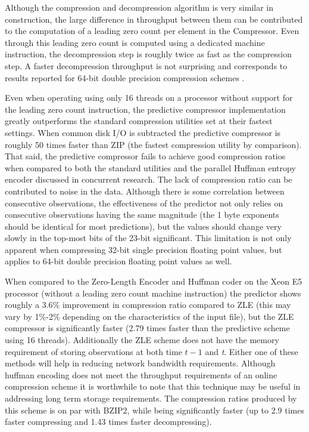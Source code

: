 Although the compression and decompression algorithm is very similar in construction, the large difference in throughput between them can be contributed to the computation of a 
leading zero count per element in the Compressor. Even through this leading zero count is computed using a dedicated machine instruction, the decompression step is roughly 
twice as fast as the compression step. A faster decompression throughput is not surprising and corresponds to results reported for 64-bit double precision compression schemes 
\cite{4976448,O'Neil:2011:FDC:1964179.1964189}.

Even when operating using only 16 threads on a processor without support for the leading zero count instruction, the predictive compressor implementation greatly outperforms the 
standard compression utilities set at their fastest settings. When common disk I/O is subtracted the predictive compressor is roughly 50 times faster than ZIP (the fastest compression 
utility by comparison). That said, the predictive compressor fails to achieve good compression ratios when compared to both the standard utilities and the parallel Huffman entropy encoder 
discussed in concurrent research. The lack of compression ratio can be contributed to noise in the data. Although there is some correlation between consecutive observations, the effectiveness 
of the predictor not only relies on consecutive observations having the same magnitude (the 1 byte exponents should be identical for most predictions), but the values should change very 
slowly in the top-most bits of the 23-bit significant. This limitation is not only apparent when compressing 32-bit single precision floating point values, but applies to 64-bit double 
precision floating point values as well.

When compared to the Zero-Length Encoder and Huffman coder on the Xeon E5 processor (without a leading zero count machine instruction) the predictor shows roughly a 3.6\% improvement
in compression ratio compared to ZLE (this may vary by 1\%-2\% depending on the characteristics of the input file), but the ZLE compressor is significantly faster (2.79 times faster than
the predictive scheme using 16 threads). Additionally the ZLE scheme does not have the memory requirement of storing observations at both time $t-1$ and \textit{t}. Either one
of these methods will help in reducing network bandwidth requirements. Although huffman encoding does not meet the throughput requirements of an online compression scheme it is worthwhile to note that this technique may be useful in addressing 
long term storage requirements. The compression ratios produced by this scheme is on par with BZIP2, while being significantly faster (up to 2.9 times faster compressing
and 1.43 times faster decompressing).

